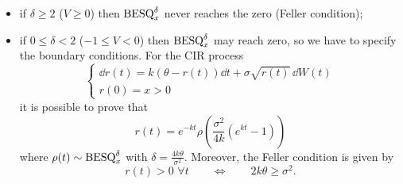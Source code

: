 \begin{itemize}
    \item if $\delta \ge 2$ ($V\ge0$) then $\text{BESQ}^{\delta}_x$ never reaches the zero (Feller condition);
    \item if $0\le\delta<2$ ($-1\le V<0$) then $\text{BESQ}^{\delta}_x$ may reach zero, so we have to specify the boundary conditions. For the CIR process
    \begin{equation*}
        \begin{cases}
            \dd r(t) = k(\theta - r(t))\dd t + \sigma\sqrt{r(t)}\,\dd W(t) \\
            r(0) = x > 0
        \end{cases}
    \end{equation*}
    it is possible to prove that
    \begin{equation*}
        r(t) = e^{-kt}\rho\left(\frac{\sigma^2}{4k}(e^{kt}-1)\right)
    \end{equation*}
    where $\rho(t)\sim \text{BESQ}^{\delta}_x$ with $\delta = \tfrac{4k\theta}{\sigma^2}$. Moreover, the Feller condition is given by
    \begin{equation*}
        r(t) > 0\,\, \forall t \qquad \Leftrightarrow \qquad 2k\theta \ge \sigma^2.
    \end{equation*}
\end{itemize}

